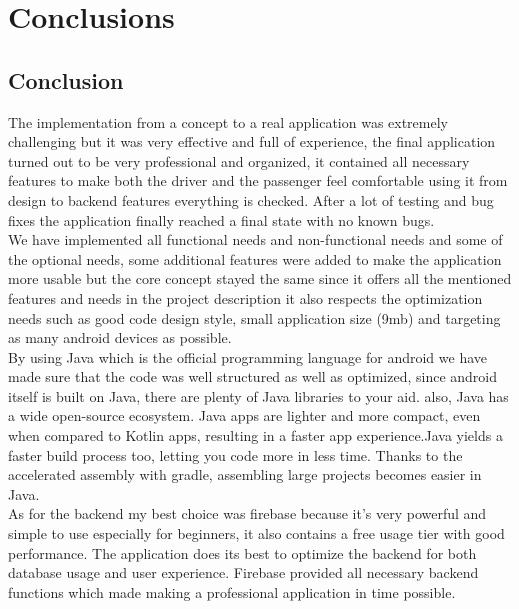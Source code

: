 \chapter{Conclusions}\label{chap:conclusions}

\section{Conclusion}
The implementation from a concept to a real application was extremely challenging but it was very effective and full of experience, the final application turned out to be very professional and organized, it contained all necessary features to make both the driver and the passenger feel comfortable using it from design to backend features everything is checked. After a lot of testing and bug fixes the application finally reached a final state with no known bugs.\\

We have implemented all functional needs and non-functional needs and some of the optional needs, some additional features were added to make the application more usable but the core concept stayed the same since it offers all the mentioned features and needs in the project description it also respects the optimization needs such as good code design style, small application size (9mb) and targeting as many android devices as possible.\\

By using Java which is the official programming language for android we have made sure that the code was well structured as well as optimized, since android itself is built on Java, there are plenty of Java libraries to your aid. also, Java has a wide open-source ecosystem. Java apps are lighter and more compact, even when compared to Kotlin apps, resulting in a faster app experience.Java yields a faster build process too, letting you code more in less time. Thanks to the accelerated assembly with gradle, assembling large projects becomes easier in Java.\\

As for the backend my best choice was firebase because it’s very powerful and simple to use especially for beginners, it also contains a free usage tier with good performance. The application does its best to optimize the backend for both database usage and user experience. Firebase provided all necessary backend functions which made making a professional application in time possible.\\
 
